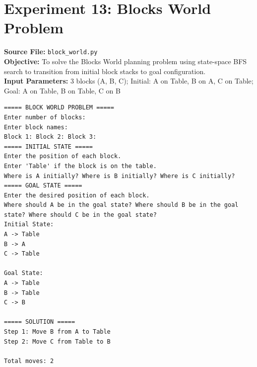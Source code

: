 \documentclass[11pt,a4paper]{article}
\begin{document}
\section{Experiment 13: Blocks World Problem}
\textbf{Source File:} \texttt{block_world.py} \\[4pt]
\textbf{Objective:} To solve the Blocks World planning problem using state-space BFS search to transition from initial block stacks to goal configuration. \\[4pt]
\textbf{Input Parameters:} 3 blocks (A, B, C); Initial: A on Table, B on A, C on Table; Goal: A on Table, B on Table, C on B \\[6pt]
\begin{tcolorbox}[colback=gray!5!white,colframe=blue!70!black,title={\textbf{Program Output: Blocks World Problem}}]
\begin{verbatim}
===== BLOCK WORLD PROBLEM =====
Enter number of blocks: 
Enter block names:
Block 1: Block 2: Block 3: 
===== INITIAL STATE =====
Enter the position of each block.
Enter 'Table' if the block is on the table.
Where is A initially? Where is B initially? Where is C initially? 
===== GOAL STATE =====
Enter the desired position of each block.
Where should A be in the goal state? Where should B be in the goal state? Where should C be in the goal state? 
Initial State:
A -> Table
B -> A
C -> Table

Goal State:
A -> Table
B -> Table
C -> B

===== SOLUTION =====
Step 1: Move B from A to Table
Step 2: Move C from Table to B

Total moves: 2
\end{verbatim}
\end{tcolorbox}
\vspace{1em}
\end{document}
